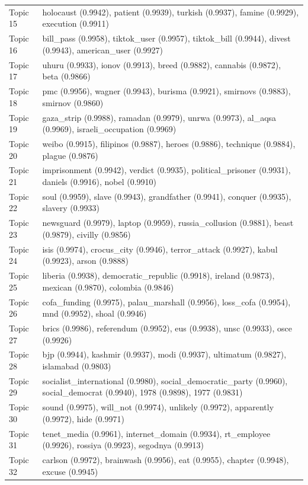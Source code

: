 \begin{table}
\begin{tabular}{lp{12cm}}
Topic 15 & holocaust (0.9942), patient (0.9939), turkish (0.9937), famine (0.9929), execution (0.9911) \\
Topic 16 & bill\_pass (0.9958), tiktok\_user (0.9957), tiktok\_bill (0.9944), divest (0.9943), american\_user (0.9927) \\
Topic 17 & uhuru (0.9933), ionov (0.9913), breed (0.9882), cannabis (0.9872), beta (0.9866) \\
Topic 18 & pmc (0.9956), wagner (0.9943), burisma (0.9921), smirnovs (0.9883), smirnov (0.9860) \\
Topic 19 & gaza\_strip (0.9988), ramadan (0.9979), unrwa (0.9973), al\_aqsa (0.9969), israeli\_occupation (0.9969) \\
Topic 20 & weibo (0.9915), filipinos (0.9887), heroes (0.9886), technique (0.9884), plague (0.9876) \\
Topic 21 & imprisonment (0.9942), verdict (0.9935), political\_prisoner (0.9931), daniels (0.9916), nobel (0.9910) \\
Topic 22 & soul (0.9959), slave (0.9943), grandfather (0.9941), conquer (0.9935), slavery (0.9933) \\
Topic 23 & newsguard (0.9979), laptop (0.9959), russia\_collusion (0.9881), beast (0.9879), civilly (0.9856) \\
Topic 24 & isis (0.9974), crocus\_city (0.9946), terror\_attack (0.9927), kabul (0.9923), arson (0.9888) \\
Topic 25 & liberia (0.9938), democratic\_republic (0.9918), ireland (0.9873), mexican (0.9870), colombia (0.9846) \\
Topic 26 & cofa\_funding (0.9975), palau\_marshall (0.9956), loss\_cofa (0.9954), mnd (0.9952), shoal (0.9946) \\
Topic 27 & brics (0.9986), referendum (0.9952), eus (0.9938), unsc (0.9933), osce (0.9926) \\
Topic 28 & bjp (0.9944), kashmir (0.9937), modi (0.9937), ultimatum (0.9827), islamabad (0.9803) \\
Topic 29 & socialist\_international (0.9980), social\_democratic\_party (0.9960), social\_democrat (0.9940), 1978 (0.9898), 1977 (0.9831) \\
Topic 30 & sound (0.9975), will\_not (0.9974), unlikely (0.9972), apparently (0.9972), hide (0.9971) \\
Topic 31 & tenet\_media (0.9961), internet\_domain (0.9934), rt\_employee (0.9926), rossiya (0.9923), segodnya (0.9913) \\
Topic 32 & carlson (0.9972), brainwash (0.9956), eat (0.9955), chapter (0.9948), excuse (0.9945) \\

\end{tabular}
\end{table}

